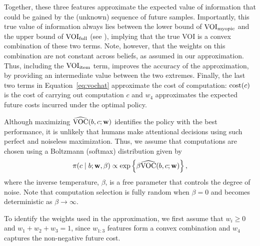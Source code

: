 Together, these three features approximate the expected value of information that could be gained by the (unknown) sequence of future samples. Importantly, this true value of information always lies between the lower bound of $\text{VOI}_\text{myopic}$ and the upper bound of $\text{VOI}_\text{full}$ (see ), implying that the true VOI is a convex combination of these two terms. Note, however, that the weights on this combination are not constant across beliefs, as assumed in our approximation. Thus, including the $\text{VOI}_\text{item}$ term, improves the accuracy of the approximation, by providing an intermediate value between the two extremes. Finally, the last two terms in Equation~\ref{eq:vochat} approximate the cost of computation: $\text{cost}(c)$ is the cost of carrying out computation $c$ and $w_{4}$ approximates the expected future costs incurred under the optimal policy.

Although maximizing $\widehat{\text{VOC}}(b, c; \mathbf{w})$ identifies the policy with the best performance, it is unlikely that humans make attentional decisions using such perfect and noiseless maximization. Thus, 
we assume that computations are chosen using a Boltzmann (softmax) distribution   \citep{mcfadden2001economic} given  by
\[
\pi(c \mid b; \mathbf{w}, \beta) \propto \exp \left\{ \beta\widehat{\text{VOC}}(b, c; \mathbf{w}) \right\},
\]
where the inverse temperature, $\beta$, is a free parameter that controls the degree of noise. Note that computation selection is fully random when $\beta=0$ and becomes deterministic as $\beta\rightarrow\infty$.



To identify the weights used in the approximation, we first assume that $w_{i}\ge0$ and $w_{1}+w_{2}+w_{3}=1$, since $w_{1:3}$ features form a convex combination and $w_4$ captures the non-negative future cost.
